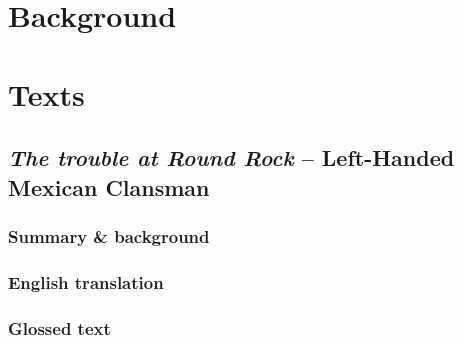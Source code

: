 \documentclass[output=book,
		  ]{langscibook}
\begin{document}

\maketitle
\frontmatter
{} %
{\sloppy\tableofcontents}
% 
 
 
\mainmatter

  

\part{Background}


\renewcommand{\exfont}{\itshape}%
\let\eachwordone=\normalfont\rmfamily%

\part{Texts}
\label{part:texts}
    \renewcommand{\thechapter}{\Alph{chapter}}
    \setcounter{chapter}{0}
    \chapter{\textit{The trouble at Round Rock} – Left-Handed Mexican Clansman}\label{chapter:text01}
    \setcounter{equation}{0}
        \tocless\section{Summary \& background}
            
        \tocless\section{English translation}
             
        \newpage
            \tocless\section{Glossed text}
            
        \newpage
\end{document}
